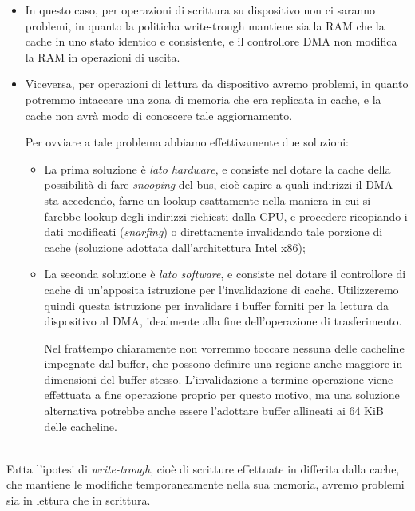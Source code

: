\documentclass[a4paper,11pt]{article}
\begin{document}
\begin{itemize}
	\item 
		In questo caso, per operazioni di scrittura su dispositivo non ci saranno problemi, in quanto la politicha write-trough mantiene sia la RAM che la cache in uno stato identico e consistente, e il controllore DMA non modifica la RAM in operazioni di uscita.
	\item
		Viceversa, per operazioni di lettura da dispositivo avremo problemi, in quanto potremmo intaccare una zona di memoria che era replicata in cache, e la cache non avrà modo di conoscere tale aggiornamento.

		Per ovviare a tale problema abbiamo effettivamente due soluzioni:
		\begin{itemize}
			\item La prima soluzione è \textit{lato hardware}, e consiste nel dotare la cache della possibilità di fare \textit{snooping} del bus, cioè capire a quali indirizzi il DMA sta accedendo, farne un lookup esattamente nella maniera in cui si farebbe lookup degli indirizzi richiesti dalla CPU, e procedere ricopiando i dati modificati (\textit{snarfing}) o direttamente invalidando tale porzione di cache (soluzione adottata dall'architettura Intel x86);
			\item La seconda soluzione è \textit{lato software}, e consiste nel dotare il controllore di cache di un'apposita istruzione per l'invalidazione di cache.
				Utilizzeremo quindi questa istruzione per invalidare i buffer forniti per la lettura da dispositivo al DMA, idealmente alla fine dell'operazione di trasferimento.

				Nel frattempo chiaramente non vorremmo toccare nessuna delle cacheline impegnate dal buffer, che possono definire una regione anche maggiore in dimensioni del buffer stesso.
				L'invalidazione a termine operazione viene effettuata a fine operazione proprio per questo motivo, ma una soluzione alternativa potrebbe anche essere l'adottare buffer allineati ai 64 KiB delle cacheline.
		\end{itemize}
\end{itemize}

\par\smallskip
\noindent
\textbf{} \\
Fatta l'ipotesi di \textit{write-trough}, cioè di scritture effettuate in differita dalla cache, che mantiene le modifiche temporaneamente nella sua memoria, avremo problemi sia in lettura che in scrittura.
\end{document}
